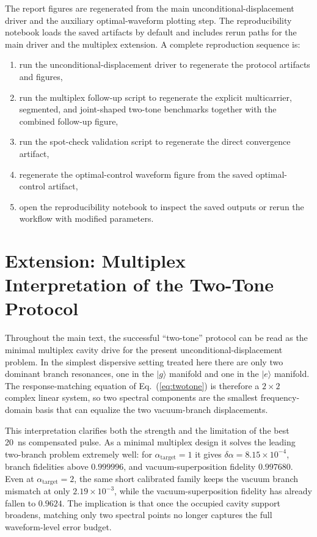 \documentclass[aps,pra,twocolumn,reprint,floatfix,amsmath,amssymb]{revtex4-2}
\begin{document}
The report figures are regenerated from the main unconditional-displacement driver and the auxiliary optimal-waveform plotting step. The reproducibility notebook loads the saved artifacts by default and includes rerun paths for the main driver and the multiplex extension. A complete reproduction sequence is:
\begin{enumerate}
  \item run the unconditional-displacement driver to regenerate the protocol artifacts and figures,
  \item run the multiplex follow-up script to regenerate the explicit multicarrier, segmented, and joint-shaped two-tone benchmarks together with the combined follow-up figure,
  \item run the spot-check validation script to regenerate the direct convergence artifact,
  \item regenerate the optimal-control waveform figure from the saved optimal-control artifact,
  \item open the reproducibility notebook to inspect the saved outputs or rerun the workflow with modified parameters.
\end{enumerate}

\section{Extension: Multiplex Interpretation of the Two-Tone Protocol}

Throughout the main text, the successful ``two-tone'' protocol can be read as the minimal multiplex cavity drive for the present unconditional-displacement problem. In the simplest dispersive setting treated here there are only two dominant branch resonances, one in the \(|g\rangle\) manifold and one in the \(|e\rangle\) manifold. The response-matching equation of Eq.~(\ref{eq:twotone}) is therefore a \(2\times 2\) complex linear system, so two spectral components are the smallest frequency-domain basis that can equalize the two vacuum-branch displacements.

This interpretation clarifies both the strength and the limitation of the best \SI{20}{\nano\second} compensated pulse. As a minimal multiplex design it solves the leading two-branch problem extremely well: for \(\alpha_{\mathrm{target}}=1\) it gives \(\delta\alpha = 8.15\times10^{-4}\), branch fidelities above \(0.999996\), and vacuum-superposition fidelity \(0.997680\). Even at \(\alpha_{\mathrm{target}}=2\), the same short calibrated family keeps the vacuum branch mismatch at only \(2.19\times10^{-3}\), while the vacuum-superposition fidelity has already fallen to \(0.9624\). The implication is that once the occupied cavity support broadens, matching only two spectral points no longer captures the full waveform-level error budget.
\end{document}
